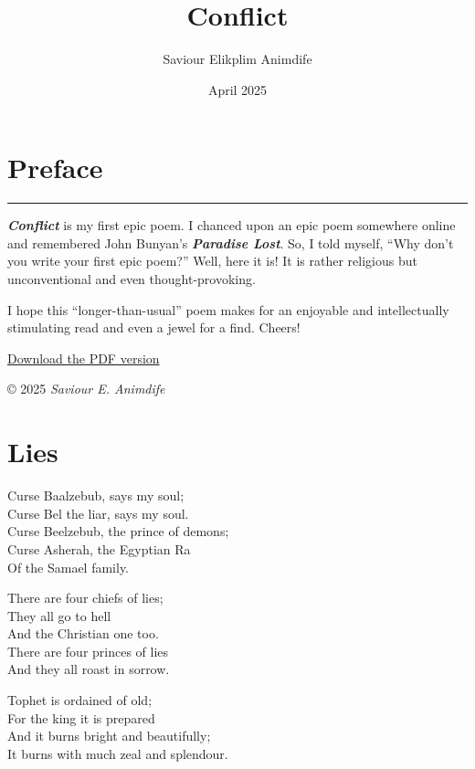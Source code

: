 \documentclass[
]{book}
\title{Conflict}
\author{Saviour Elikplim Animdife}
\date{April 2025}
\begin{document}
\maketitle

{
\setcounter{tocdepth}{1}
\tableofcontents
}
\chapter*{Preface}\label{preface}

\begin{center}\rule{0.5\linewidth}{0.5pt}\end{center}

\textbf{\emph{Conflict}} is my first epic poem. I chanced upon an epic poem somewhere online and remembered John Bunyan's \textbf{\emph{Paradise Lost}}. So, I told myself, ``Why don't you write your first epic poem?'' Well, here it is! It is rather religious but unconventional and even thought-provoking.

I hope this ``longer-than-usual'' poem makes for an enjoyable and intellectually stimulating read and even a jewel for a find. Cheers!

\href{https://github.com/sneurocode/conflict/blob/master/docs/_main.pdf}{Download the PDF version}

© 2025 \emph{Saviour E. Animdife}

\chapter{Lies}\label{lies}

Curse Baalzebub, says my soul;\\
Curse Bel the liar, says my soul.\\
Curse Beelzebub, the prince of demons;\\
Curse Asherah, the Egyptian Ra\\
Of the Samael family.

There are four chiefs of lies;\\
They all go to hell\\
And the Christian one too.\\
There are four princes of lies\\
And they all roast in sorrow.

Tophet is ordained of old;\\
For the king it is prepared\\
And it burns bright and beautifully;\\
It burns with much zeal and splendour.
\end{document}
